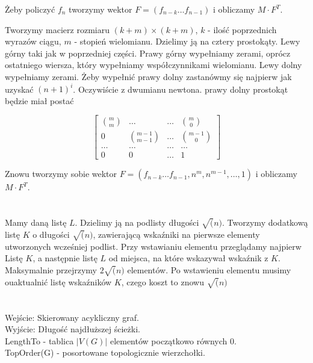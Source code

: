 Żeby policzyć $f_n$ tworzymy wektor $F = (f_{n-k} \ldots f_{n-1})$ i obliczamy $M\cdot F^T$.\newline


Tworzymy macierz rozmiaru $(k+m) \times (k+m)$, $k$ - ilość poprzednich wyrazów ciągu, $m$ - stopień wielomianu.
Dzielimy ją na cztery prostokąty. Lewy górny taki jak w poprzedniej części. Prawy górny wypełniamy zerami, oprócz ostatniego wiersza, który wypełniamy współczynnikami wielomianu. Lewy dolny wypełniamy zerami. Żeby wypełnić prawy dolny zastanówmy się najpierw jak uzyskać $(n+1)^i$. Oczywiście z dwumianu newtona. prawy dolny prostokąt będzie miał postać

\[
 \left[
 	\begin{array}{cccc}
 	{m \choose m}	&	\ldots				&	\ldots	& 	{m \choose 0}\\
 	0 				&	{m-1\choose m-1}	&	\ldots	&	{m-1 \choose 0}\\
 	\ldots			& 	\ldots 				& 	\ldots	& 	\ldots\\
 	0				&	0					&	\ldots	&	1
 	\end{array}
 \right]
\]


Znowu tworzymy sobie wektor $F = (f_{n-k} \ldots f_{n-1}, n^m, n^{m-1}, \dots, 1)$ i obliczamy $M\cdot F^T$.

\section{}


\section{}

Mamy daną listę $L$. Dzielimy ją na podlisty długości $\sqrt(n)$. Tworzymy dodatkową listę $K$ o długości $\sqrt(n)$, zawierającą wskaźniki na pierwsze elementy utworzonych wcześniej podlist. Przy wstawianiu elementu przeglądamy najpierw Listę $K$, a następnie listę $L$ od miejsca, na które wskazywał wskaźnik z $K$. Maksymalnie przejrzymy $2\sqrt(n)$ elementów. Po wstawieniu elementu musimy ouaktualnić listę wskaźników $K$, czego koszt to znowu $\sqrt(n)$

\section{}

Wejście: Skierowany acykliczny graf.\\
Wyjście: Długość najdłuższej ścieżki.\\
LengthTo - tablica $|V(G)|$ elementów początkowo równych 0.\\
TopOrder(G) - posortowane topologicznie wierzchołki.\\


